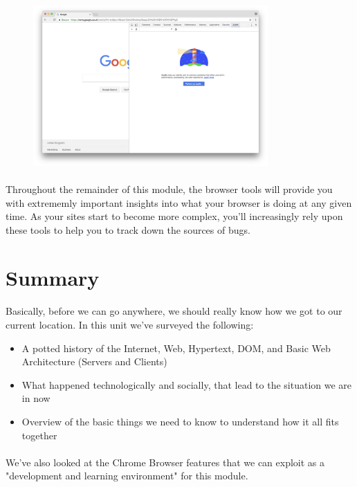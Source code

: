 \begin{figure}[H]
\centering
\includegraphics[width=0.8\textwidth]{figures/devtools-audits.png}
\label{fig:devtools-audits}
\end{figure}

\paragraph{} Throughout the remainder of this module, the browser tools will provide you with extrememly important insights into what your browser is doing at any given time. As your sites start to become more complex, you'll increasingly rely upon these tools to help you to track down the sources of bugs.


\section{Summary}
\paragraph{} Basically, before we can go anywhere, we should really know how we got to our current location. In this unit we've surveyed the following:

\begin{itemize}
\item A potted history of the Internet, Web, Hypertext, DOM, and Basic Web Architecture (Servers and Clients)
\item What happened technologically and socially, that lead to the situation we are in now
\item Overview of the basic things we need to know to understand how it all fits together
\end{itemize}

\paragraph{} We've also looked at the Chrome Browser features that we can exploit as a "development and learning environment" for this module.

